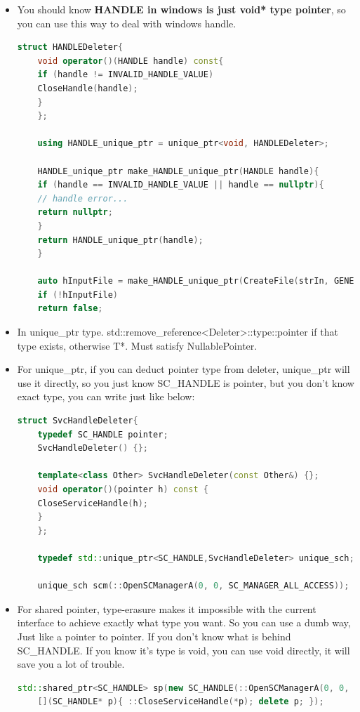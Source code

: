 \documentclass[a4paper,12pt,twoside]{book}
\begin{document}
\begin{itemize}
	\item You should know \textbf{HANDLE in windows is just void* type pointer}, so you can use this way to deal with windows handle.
	
	\begin{lstlisting}[frame=single, language=c++]
	struct HANDLEDeleter{
	void operator()(HANDLE handle) const{
	if (handle != INVALID_HANDLE_VALUE)
	CloseHandle(handle);
	}
	};
	
	using HANDLE_unique_ptr = unique_ptr<void, HANDLEDeleter>;
	
	HANDLE_unique_ptr make_HANDLE_unique_ptr(HANDLE handle){
	if (handle == INVALID_HANDLE_VALUE || handle == nullptr){
	// handle error...
	return nullptr;
	}
	return HANDLE_unique_ptr(handle);
	}
	
	auto hInputFile = make_HANDLE_unique_ptr(CreateFile(strIn, GENERIC_READ, ...));
	if (!hInputFile)
	return false;
	\end{lstlisting}
	
	\item In unique\_ptr type. std::remove\_reference<Deleter>::type::pointer if that type exists, otherwise T*. Must satisfy NullablePointer.
	
	\item For unique\_ptr, if you can deduct pointer type from deleter, unique\_ptr will use it directly, so you just know SC\_HANDLE is pointer, but you don't know exact type, you can write just like below: 
	\begin{lstlisting}[frame=single, language=c++]
	struct SvcHandleDeleter{
	typedef SC_HANDLE pointer;
	SvcHandleDeleter() {};
	
	template<class Other> SvcHandleDeleter(const Other&) {};
	void operator()(pointer h) const {
	CloseServiceHandle(h);
	}
	};
	
	typedef std::unique_ptr<SC_HANDLE,SvcHandleDeleter> unique_sch;
	
	unique_sch scm(::OpenSCManagerA(0, 0, SC_MANAGER_ALL_ACCESS));
	\end{lstlisting}
	
	\item For shared pointer, type-erasure makes it impossible with the current interface to achieve exactly what type you want. So you can use a dumb way, Just like a pointer to pointer. If you don't know what is behind SC\_HANDLE. If you know it's type is void, you can use void directly, it will save you a lot of trouble. 
	
	\begin{lstlisting}[frame=single, language=c++]
	std::shared_ptr<SC_HANDLE> sp(new SC_HANDLE(::OpenSCManagerA(0, 0, SC_MANAGER_ALL_ACCESS)),
	[](SC_HANDLE* p){ ::CloseServiceHandle(*p); delete p; });
	\end{lstlisting}
	

\end{itemize}
\end{document}
